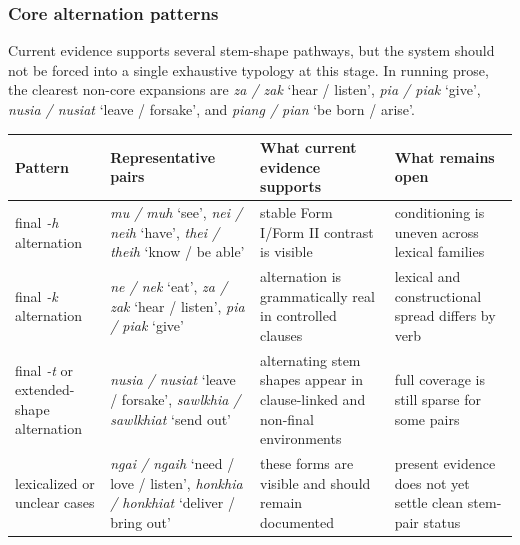\documentclass[
  11pt,
  a4paper,
]{article}
\newcounter{none} %
\newcommand{\tdim}[1]{\textit{#1}}
\newcommand{\glossquote}[1]{`#1'}
\begin{document}
\subsubsection{Core alternation
patterns}\label{core-alternation-patterns}

Current evidence supports several stem-shape pathways, but the system
should not be forced into a single exhaustive typology at this stage. In
running prose, the clearest non-core expansions are \tdim{za / zak}
\glossquote{hear / listen}, \tdim{pia / piak} \glossquote{give},
\tdim{nusia / nusiat} \glossquote{leave / forsake}, and
\tdim{piang / pian} \glossquote{be born / arise}.

{\def\LTcaptype{none} %
\begin{longtable}[]{@{}
  >{\raggedright\arraybackslash}p{}
  >{\raggedright\arraybackslash}p{}
  >{\raggedright\arraybackslash}p{}
  >{\raggedright\arraybackslash}p{}@{}}
\toprule\noalign{}
\begin{minipage}[b]{\linewidth}\raggedright
Pattern
\end{minipage} & \begin{minipage}[b]{\linewidth}\raggedright
Representative pairs
\end{minipage} & \begin{minipage}[b]{\linewidth}\raggedright
What current evidence supports
\end{minipage} & \begin{minipage}[b]{\linewidth}\raggedright
What remains open
\end{minipage} \\
\midrule\noalign{}
\endhead
\bottomrule\noalign{}
\endlastfoot
final \tdim{-h} alternation & \tdim{mu / muh} \glossquote{see},
\tdim{nei / neih} \glossquote{have}, \tdim{thei / theih}
\glossquote{know / be able} & stable Form I/Form II contrast is visible
& conditioning is uneven across lexical families \\
final \tdim{-k} alternation & \tdim{ne / nek} \glossquote{eat},
\tdim{za / zak} \glossquote{hear / listen}, \tdim{pia / piak}
\glossquote{give} & alternation is grammatically real in controlled
clauses & lexical and constructional spread differs by verb \\
final \tdim{-t} or extended-shape alternation & \tdim{nusia / nusiat}
\glossquote{leave / forsake}, \tdim{sawlkhia / sawlkhiat}
\glossquote{send out} & alternating stem shapes appear in clause-linked
and non-final environments & full coverage is still sparse for some
pairs \\
lexicalized or unclear cases & \tdim{ngai / ngaih}
\glossquote{need / love / listen}, \tdim{honkhia / honkhiat}
\glossquote{deliver / bring out} & these forms are visible and should
remain documented & present evidence does not yet settle clean stem-pair
status \\
\end{longtable}
}
\end{document}
